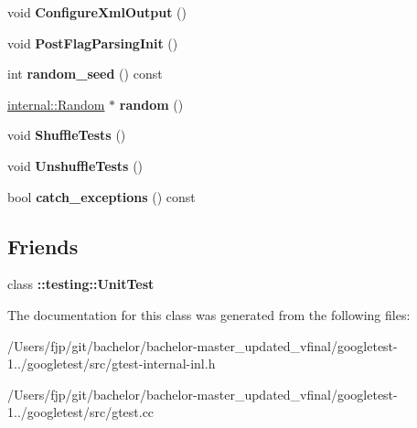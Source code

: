 \begin{DoxyCompactItemize}
void {\bfseries Configure\+Xml\+Output} ()
\item 
\mbox{\label{classtesting_1_1internal_1_1_unit_test_impl_a772894193104b1b2516f16e6ff813168}} 
void {\bfseries Post\+Flag\+Parsing\+Init} ()
\item 
\mbox{\label{classtesting_1_1internal_1_1_unit_test_impl_a625b9fb6d17b008c44fc902255e6343c}} 
int {\bfseries random\+\_\+seed} () const
\item 
\mbox{\label{classtesting_1_1internal_1_1_unit_test_impl_ab3b45b5eb4d583219a3602011ea44347}} 
\mbox{\hyperlink{classtesting_1_1internal_1_1_random}{internal\+::\+Random}} $\ast$ {\bfseries random} ()
\item 
\mbox{\label{classtesting_1_1internal_1_1_unit_test_impl_aaaa38e6a4372e6bb9bbe3143a3a32b65}} 
void {\bfseries Shuffle\+Tests} ()
\item 
\mbox{\label{classtesting_1_1internal_1_1_unit_test_impl_a1ee7db3bf8284dd9dce4dc857564bce3}} 
void {\bfseries Unshuffle\+Tests} ()
\item 
\mbox{\label{classtesting_1_1internal_1_1_unit_test_impl_aa311b980783a9cfb547831f7b19e3f3a}} 
bool {\bfseries catch\+\_\+exceptions} () const
\end{DoxyCompactItemize}
\subsection*{Friends}
\begin{DoxyCompactItemize}
\item 
\mbox{\label{classtesting_1_1internal_1_1_unit_test_impl_a893404438388dec058dc5c02e8f9a014}} 
class {\bfseries \+::testing\+::\+Unit\+Test}
\end{DoxyCompactItemize}


The documentation for this class was generated from the following files\+:\begin{DoxyCompactItemize}
\item 
/\+Users/fjp/git/bachelor/bachelor-\/master\+\_\+updated\+\_\+vfinal/googletest-\/1../googletest/src/gtest-\/internal-\/inl.\+h\item 
/\+Users/fjp/git/bachelor/bachelor-\/master\+\_\+updated\+\_\+vfinal/googletest-\/1../googletest/src/gtest.\+cc\end{DoxyCompactItemize}
